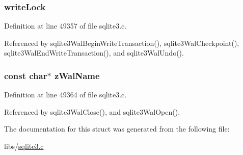 \hypertarget{struct_wal_ae97068d177001a108b055686f9a8cfa4}{}
\subsubsection[{write\+Lock}]{ write\+Lock}\label{struct_wal_ae97068d177001a108b055686f9a8cfa4}


Definition at line 49357 of file sqlite3.\+c.



Referenced by sqlite3\+Wal\+Begin\+Write\+Transaction(), sqlite3\+Wal\+Checkpoint(), sqlite3\+Wal\+End\+Write\+Transaction(), and sqlite3\+Wal\+Undo().

\hypertarget{struct_wal_a1ce1fadb7980c34f6b8c4b77ddfbb70b}{}
\subsubsection[{z\+Wal\+Name}]{\setlength{\rightskip}{0pt plus 5cm}const char$\ast$ z\+Wal\+Name}\label{struct_wal_a1ce1fadb7980c34f6b8c4b77ddfbb70b}


Definition at line 49364 of file sqlite3.\+c.



Referenced by sqlite3\+Wal\+Close(), and sqlite3\+Wal\+Open().



The documentation for this struct was generated from the following file\+:\begin{DoxyCompactItemize}
\item 
libs/\hyperlink{sqlite3_8c}{sqlite3.\+c}\end{DoxyCompactItemize}
